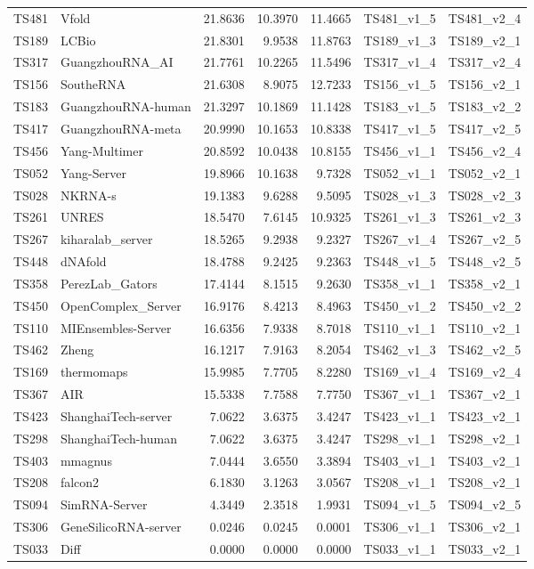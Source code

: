 \begin{table}[ht]
{\begin{tabular}{llrrrll}
TS481 & Vfold & 21.8636 & 10.3970 & 11.4665 & TS481\_v1\_5 & TS481\_v2\_4 \\ 
TS189 & LCBio & 21.8301 & 9.9538 & 11.8763 & TS189\_v1\_3 & TS189\_v2\_1 \\ 
TS317 & GuangzhouRNA\_AI & 21.7761 & 10.2265 & 11.5496 & TS317\_v1\_4 & TS317\_v2\_4 \\ 
TS156 & SoutheRNA & 21.6308 & 8.9075 & 12.7233 & TS156\_v1\_5 & TS156\_v2\_1 \\ 
TS183 & GuangzhouRNA-human & 21.3297 & 10.1869 & 11.1428 & TS183\_v1\_5 & TS183\_v2\_2 \\ 
TS417 & GuangzhouRNA-meta & 20.9990 & 10.1653 & 10.8338 & TS417\_v1\_5 & TS417\_v2\_5 \\ 
TS456 & Yang-Multimer & 20.8592 & 10.0438 & 10.8155 & TS456\_v1\_1 & TS456\_v2\_4 \\ 
TS052 & Yang-Server & 19.8966 & 10.1638 & 9.7328 & TS052\_v1\_1 & TS052\_v2\_1 \\ 
TS028 & NKRNA-s & 19.1383 & 9.6288 & 9.5095 & TS028\_v1\_3 & TS028\_v2\_3 \\ 
TS261 & UNRES & 18.5470 & 7.6145 & 10.9325 & TS261\_v1\_3 & TS261\_v2\_3 \\ 
TS267 & kiharalab\_server & 18.5265 & 9.2938 & 9.2327 & TS267\_v1\_4 & TS267\_v2\_5 \\ 
TS448 & dNAfold & 18.4788 & 9.2425 & 9.2363 & TS448\_v1\_5 & TS448\_v2\_5 \\ 
TS358 & PerezLab\_Gators & 17.4144 & 8.1515 & 9.2630 & TS358\_v1\_1 & TS358\_v2\_1 \\ 
TS450 & OpenComplex\_Server & 16.9176 & 8.4213 & 8.4963 & TS450\_v1\_2 & TS450\_v2\_2 \\ 
TS110 & MIEnsembles-Server & 16.6356 & 7.9338 & 8.7018 & TS110\_v1\_1 & TS110\_v2\_1 \\ 
TS462 & Zheng & 16.1217 & 7.9163 & 8.2054 & TS462\_v1\_3 & TS462\_v2\_5 \\ 
TS169 & thermomaps & 15.9985 & 7.7705 & 8.2280 & TS169\_v1\_4 & TS169\_v2\_4 \\ 
TS367 & AIR & 15.5338 & 7.7588 & 7.7750 & TS367\_v1\_1 & TS367\_v2\_1 \\ 
TS423 & ShanghaiTech-server & 7.0622 & 3.6375 & 3.4247 & TS423\_v1\_1 & TS423\_v2\_1 \\ 
TS298 & ShanghaiTech-human & 7.0622 & 3.6375 & 3.4247 & TS298\_v1\_1 & TS298\_v2\_1 \\ 
TS403 & mmagnus & 7.0444 & 3.6550 & 3.3894 & TS403\_v1\_1 & TS403\_v2\_1 \\ 
TS208 & falcon2 & 6.1830 & 3.1263 & 3.0567 & TS208\_v1\_1 & TS208\_v2\_1 \\ 
TS094 & SimRNA-Server & 4.3449 & 2.3518 & 1.9931 & TS094\_v1\_5 & TS094\_v2\_5 \\ 
TS306 & GeneSilicoRNA-server & 0.0246 & 0.0245 & 0.0001 & TS306\_v1\_1 & TS306\_v2\_1 \\ 
TS033 & Diff & 0.0000 & 0.0000 & 0.0000 & TS033\_v1\_1 & TS033\_v2\_1 \\ 
\bottomrule
\end{tabular}%
}
\end{table}
